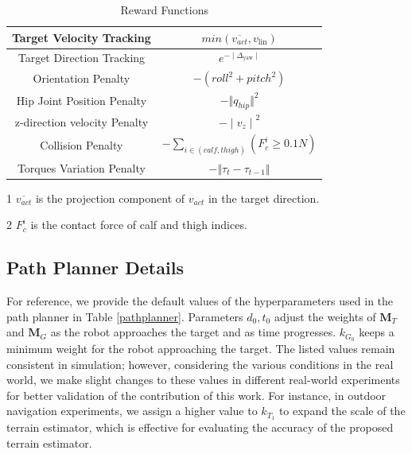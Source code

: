 \documentclass[conference]{IEEEtran}
\begin{document}
\begin{table}[h]
\small
\renewcommand{\arraystretch}{1.3}
\caption{Reward Functions}
\begin{center}
\begin{threeparttable}
\begin{tabular}{|c|c|}
\hline
 Target Velocity Tracking\tnote{1}&$min(\overline{v_{act}},v_\textrm{lin})$\\
 \hline
 Target Direction Tracking&$e^{- \mid \Delta_\textrm{yaw} \mid}$\\
 \hline
 Orientation Penalty& $-(roll^2+pitch^2)$\\
 \hline
 Hip Joint Position Penalty& ${-\Vert q_{hip} \Vert}^2$\\
 \hline
 z-direction velocity Penalty& ${-\mid v_{z} \mid}^2 $\\
 \hline
 Collision Penalty\tnote{2}& $-\sum_{i \in (calf,thigh)}({F_c^i  \geq 0.1N})$\\
 \hline
Torques Variation Penalty& ${-\Vert \tau_t-\tau_{t-1} \Vert}$\\
 \hline
\end{tabular}
 \begin{tablenotes}
\footnotesize            
\item[1] $\overline{v_{act}}$ is the projection component of $v_{act}$ in the target direction.
\item[2] $F_c^i$ is the contact force of calf and thigh indices.
\end{tablenotes} 
\end{threeparttable}  
\label{reward}
\end{center}
\end{table}

\subsection{Path Planner Details}
For reference, we provide the default values of the hyperparameters used in the path planner in Table \ref{pathplanner}. Parameters $d_0,t_0$ adjust the weights of $\bm{M}_T$ and $\bm{M}_G$ as the robot approaches the target and as time progresses. $k_{G_0}$ keeps a minimum weight for the robot approaching the target. The listed values remain consistent in simulation; however, considering the various conditions in the real world, we make slight changes to these values in different real-world experiments for better validation of the contribution of this work. For instance, in outdoor navigation experiments, we assign a higher value to $k_{T_1}$ to expand the scale of the terrain estimator, which is effective for evaluating the accuracy of the proposed terrain estimator.
\end{document}
